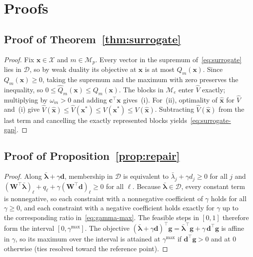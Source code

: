 \section{Proofs}\label{app:proofs}

\subsection{Proof of Theorem~\ref{thm:surrogate}}
\begin{proof}
Fix $\mathbf x\in\mathcal X$ and $m\in\mathcal M_p$. Every vector in the supremum of~\eqref{eq:surrogate} lies in $\mathcal D$, so by weak duality its objective at $\mathbf x$ is at most $Q_m(\mathbf x)$. Since $Q_m(\mathbf x)\ge0$, taking the supremum and the maximum with zero preserves the inequality, so $0\le\widehat Q_m(\mathbf x)\le Q_m(\mathbf x)$. The blocks in $\mathcal M_e$ enter $\widehat V$ exactly; multiplying by $\omega_m>0$ and adding $\mathbf c^\top\mathbf x$ gives~(i). For~(ii), optimality of $\widehat{\mathbf x}$ for $\widehat V$ and~(i) give $\widehat V(\widehat{\mathbf x})\le\widehat V(\mathbf x^*)\le V(\mathbf x^*)\le V(\widehat{\mathbf x})$. Subtracting $\widehat V(\widehat{\mathbf x})$ from the last term and cancelling the exactly represented blocks yields~\eqref{eq:surrogate-gap}.
\end{proof}

\subsection{Proof of Proposition~\ref{prop:repair}}
\begin{proof}
Along $\bar{\boldsymbol\lambda}+\gamma\mathbf d$, membership in $\mathcal D$ is equivalent to $\bar\lambda_j+\gamma d_j\ge0$ for all $j$ and $(\mathbf W^\top\bar{\boldsymbol\lambda})_\ell+q_\ell+\gamma(\mathbf W^\top\mathbf d)_\ell\ge0$ for all $\ell$. Because $\bar{\boldsymbol\lambda}\in\mathcal D$, every constant term is nonnegative, so each constraint with a nonnegative coefficient of $\gamma$ holds for all $\gamma\ge0$, and each constraint with a negative coefficient holds exactly for $\gamma$ up to the corresponding ratio in~\eqref{eq:gamma-max}. The feasible steps in $[0,1]$ therefore form the interval $[0,\gamma^{\max}]$. The objective $(\bar{\boldsymbol\lambda}+\gamma\mathbf d)^\top\mathbf g=\bar{\boldsymbol\lambda}^\top\mathbf g+\gamma\,\mathbf d^\top\mathbf g$ is affine in $\gamma$, so its maximum over the interval is attained at $\gamma^{\max}$ if $\mathbf d^\top\mathbf g>0$ and at $0$ otherwise (ties resolved toward the reference point).
\end{proof}

